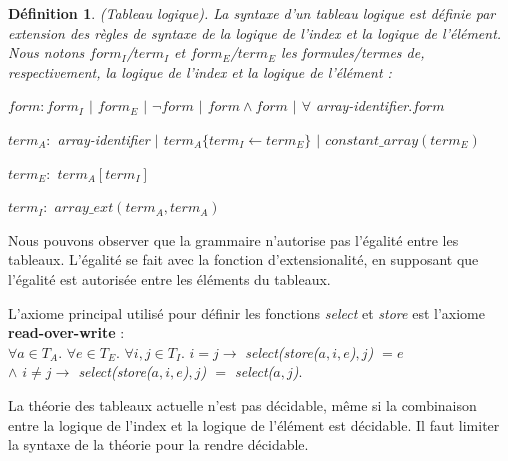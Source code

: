 \documentclass[11pt,openany]{article}
\newtheorem{definition}{D\'efinition}[subsection]
\begin{document}
	\begin{definition}
(Tableau logique). La syntaxe d'un tableau logique est d\'efinie par extension des r\`egles de syntaxe de la logique de l'index et la logique de l'\'el\'ement. Nous notons $form_{I}$/$term_{I}$ et $form_{E}$/$term_{E}$ les formules/termes de, respectivement, la logique de l'index et la logique de l'\'el\'ement :\par
$form : form_{I}$ $|$ $form_{E}$ $|$ $\neg form$ $|$ $form\land form$ $|$ $\forall$ array-identifier$. form$\par
$term_{A} :$ array-identifier $|$ $term_{A}\{term_{I}\leftarrow term_{E}\}$ $|$ $constant\_array(term_{E})$\par
$term_{E} :$ $term_{A}[term_{I}]$\par
$term_{I} :$ $array\_ext(term_{A},term_{A})$

\end{definition}
	Nous pouvons observer que la grammaire n'autorise pas l'\'egalit\'e entre les tableaux. L'\'egalit\'e se fait avec la fonction d'extensionalit\'e, en supposant que l'\'egalit\'e est autoris\'ee entre les \'el\'ements du tableaux.\par
	L'axiome principal utilis\'e pour d\'efinir les fonctions \textit{select} et \textit{store} est l'axiome \textbf{read-over-write} :\\
	$\forall a\in T_{A}.$ $\forall e\in T_{E}.$ $\forall i,j\in T_{I}.$ $i=j \rightarrow$ \textit{select(store($a,i,e$)$,j$) $ = e$
			\\ $\land$ $i\neq j \rightarrow$ select(store($a,i,e$)$,j$) $=$ select($a,j$)}.\par
	La th\'eorie des tableaux actuelle n'est pas d\'ecidable, m\^eme si la combinaison entre la logique de l'index et la logique de l'\'el\'ement est d\'ecidable. Il faut limiter la syntaxe de la th\'eorie pour la rendre d\'ecidable.
\end{document}
